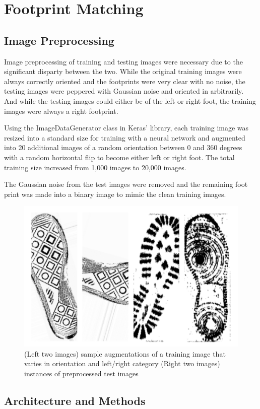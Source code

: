 \documentclass{article}
\begin{document}
\section{Footprint Matching}

\subsection{Image Preprocessing}

Image preprocessing of training and testing images were necessary due to the significant disparty between the two. While the original training images were always correctly oriented and the footprints were very clear with no noise, the testing images were peppered with Gaussian noise and oriented in arbitrarily. And while the testing images could either be of the left or right foot, the training images were always a right footprint.

Using the ImageDataGenerator class in Keras' library, each training image was resized into a standard size for training with a neural network and augmented into 20 additional images of a random orientation between 0 and 360 degrees with a random horizontal flip to become either left or right foot. The total training size increased from 1,000 images to 20,000 images.

The Gaussian noise from the test images were removed and the remaining foot print was made into a binary image to mimic the clean training images. 

\begin{figure}[h]
  \begin{center}
  \includegraphics[width=0.5\linewidth]{2_preprocessing.png}
  \caption{(Left two images) sample augmentations of a training image that varies in orientation and left/right category (Right two images) instances of preprocessed test images}
    \end{center}
  \label{fig:preprocessing_2}
\end{figure}


\subsection{Architecture and Methods}
\end{document}
